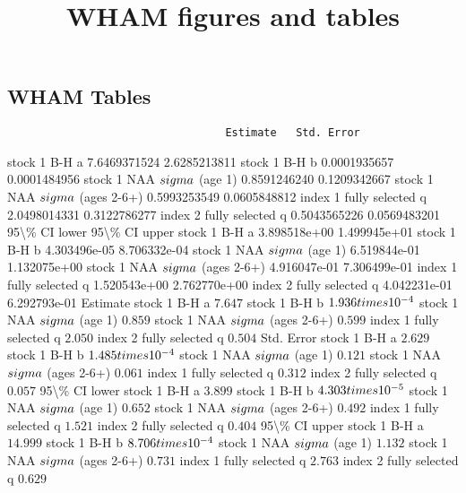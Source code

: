 \documentclass[
]{article}
\title{WHAM figures and tables}
\author{}
\date{\vspace{-2.5em}}
\begin{document}
\maketitle

\subsection{WHAM Tables}\label{wham-tables}

\begin{verbatim}
                                  Estimate   Std. Error
\end{verbatim}

stock 1 B-H a 7.6469371524 2.6285213811 stock 1 B-H b 0.0001935657
0.0001484956 stock 1 NAA \(\\sigma\) (age 1) 0.8591246240 0.1209342667
stock 1 NAA \(\\sigma\) (ages 2-6+) 0.5993253549 0.0605848812 index 1
fully selected q 2.0498014331 0.3122786277 index 2 fully selected q
0.5043565226 0.0569483201 95\textbackslash\% CI lower 95\textbackslash\%
CI upper stock 1 B-H a 3.898518e+00 1.499945e+01 stock 1 B-H b
4.303496e-05 8.706332e-04 stock 1 NAA \(\\sigma\) (age 1) 6.519844e-01
1.132075e+00 stock 1 NAA \(\\sigma\) (ages 2-6+) 4.916047e-01
7.306499e-01 index 1 fully selected q 1.520543e+00 2.762770e+00 index 2
fully selected q 4.042231e-01 6.292793e-01 Estimate stock 1 B-H a
\(7.647\) stock 1 B-H b \(1.936\\times 10^{-4}\) stock 1 NAA \(\\sigma\)
(age 1) \(0.859\) stock 1 NAA \(\\sigma\) (ages 2-6+) \(0.599\) index 1
fully selected q \(2.050\) index 2 fully selected q \(0.504\) Std. Error
stock 1 B-H a \(2.629\) stock 1 B-H b \(1.485\\times 10^{-4}\) stock 1
NAA \(\\sigma\) (age 1) \(0.121\) stock 1 NAA \(\\sigma\) (ages 2-6+)
\(0.061\) index 1 fully selected q \(0.312\) index 2 fully selected q
\(0.057\) 95\textbackslash\% CI lower stock 1 B-H a \(3.899\) stock 1
B-H b \(4.303\\times 10^{-5}\) stock 1 NAA \(\\sigma\) (age 1) \(0.652\)
stock 1 NAA \(\\sigma\) (ages 2-6+) \(0.492\) index 1 fully selected q
\(1.521\) index 2 fully selected q \(0.404\) 95\textbackslash\% CI upper
stock 1 B-H a \(14.999\) stock 1 B-H b \(8.706\\times 10^{-4}\) stock 1
NAA \(\\sigma\) (age 1) \(1.132\) stock 1 NAA \(\\sigma\) (ages 2-6+)
\(0.731\) index 1 fully selected q \(2.763\) index 2 fully selected q
\(0.629\)
\end{document}
